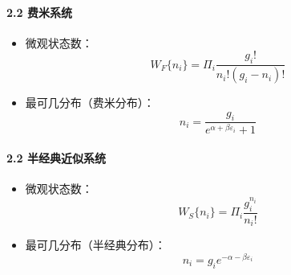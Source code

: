 \documentclass[UTF8,twocolumn]{ctexart}
\providecommand{\tightlist}{%
  \setlength{\itemsep}{0pt}\setlength{\parskip}{0pt}}
\let\oldparagraph\paragraph
\renewcommand{\paragraph}[1]{\oldparagraph{#1}\mbox{}}
\begin{document}
\paragraph{2.2 费米系统}\label{ux8d39ux7c73ux7cfbux7edf}

\begin{itemize}
\tightlist
\item
  微观状态数： \[W_F\{n_i\}=\Pi_i\frac{g_i!}{n_i!(g_i-n_i)!}\]
\item
  最可几分布（费米分布）：
  \[n_i=\frac{g_i}{e^{\alpha+\beta\varepsilon_i}+1}\]
\end{itemize}

\paragraph{2.2
半经典近似系统}\label{ux534aux7ecfux5178ux8fd1ux4f3cux7cfbux7edf}

\begin{itemize}
\tightlist
\item
  微观状态数： \[W_S\{n_i\}=\Pi_i\frac{g_i^{n_i}}{n_i!}\]
\item
  最可几分布（半经典分布）： \[n_i=g_ie^{-\alpha-\beta\varepsilon_i}\]
\end{itemize}
\end{document}
